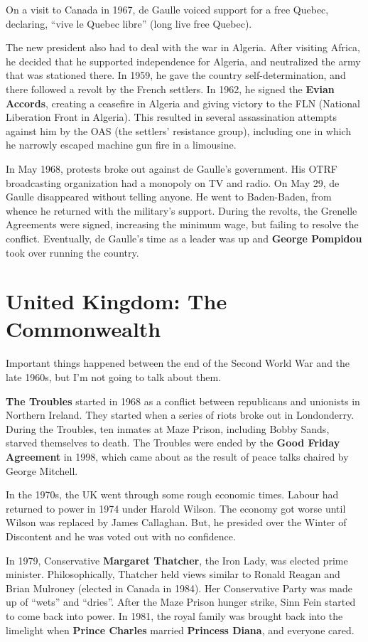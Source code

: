 On a visit to Canada in 1967, de Gaulle voiced support for a free Quebec,
declaring, ``vive le Quebec libre'' (long live free Quebec).

The new president also had to deal with the war in Algeria.
After visiting Africa, he decided that he supported independence for Algeria,
and neutralized the army that was stationed there.
In 1959, he gave the country self-determination, and there followed a revolt by the French settlers.
In 1962, he signed the \textbf{Evian Accords},
creating a ceasefire in Algeria and giving victory to the FLN (National Liberation Front in Algeria).
This resulted in several assassination attempts against him by the OAS (the settlers' resistance group),
including one in which he narrowly escaped machine gun fire in a limousine.

In May 1968, protests broke out against de Gaulle's government.
His OTRF broadcasting organization had a monopoly on TV and radio.
On May 29, de Gaulle disappeared without telling anyone.
He went to Baden-Baden, from whence he returned with the military's support.
During the revolts, the Grenelle Agreements were signed, increasing the minimum wage,
but failing to resolve the conflict.
Eventually, de Gaulle's time as a leader was up and \textbf{George Pompidou} took over running the country.

\section{United Kingdom: The Commonwealth}

Important things happened between the end of the Second World War and the late 1960s,
but I'm not going to talk about them.

\textbf{The Troubles} started in 1968 as a conflict between republicans and unionists in Northern Ireland.
They started when a series of riots broke out in Londonderry.
During the Troubles, ten inmates at Maze Prison, including Bobby Sands,
starved themselves to death.
The Troubles were ended by the \textbf{Good Friday Agreement} in 1998,
which came about as the result of peace talks chaired by George Mitchell.

In the 1970s, the UK went through some rough economic times.
Labour had returned to power in 1974 under Harold Wilson.
The economy got worse until Wilson was replaced by James Callaghan.
But, he presided over the Winter of Discontent and he was voted out with no confidence.

In 1979, Conservative \textbf{Margaret Thatcher}, the Iron Lady, was elected prime minister.
Philosophically, Thatcher held views similar to Ronald Reagan and Brian Mulroney (elected in Canada in 1984).
Her Conservative Party was made up of ``wets'' and ``dries''.
After the Maze Prison hunger strike, Sinn Fein started to come back into power.
In 1981, the royal family was brought back into the limelight when
\textbf{Prince Charles} married \textbf{Princess Diana}, and everyone cared.


